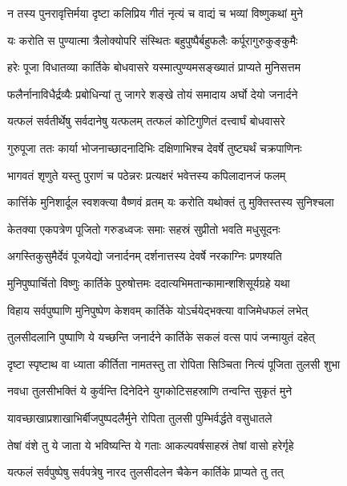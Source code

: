 \twolineshloka
{न तस्य पुनरावृत्तिर्मया दृष्टा कलिप्रिय}
{गीतं नृत्यं च वाद्यं च भव्यां विष्णुकथां मुने}%

\twolineshloka
{यः करोति स पुण्यात्मा त्रैलोक्योपरि संस्थितः}
{बहुपुष्पैर्बहुफलैः कर्पूरागुरुकुङ्कुमैः}%

\twolineshloka
{हरेः पूजा विधातव्या कार्तिके बोधवासरे}
{यस्मात्पुण्यमसङ्ख्यातं प्राप्यते मुनिसत्तम}%

\twolineshloka
{फलैर्नानाविधैर्द्रव्यैः प्रबोधिन्यां तु जागरे}
{शङ्खे तोयं समादाय अर्घो देयो जनार्दने}%

\twolineshloka
{यत्फलं सर्वतीर्थेषु सर्वदानेषु यत्फलम्}
{तत्फलं कोटिगुणितं दत्त्वार्घं बोधवासरे}%

\twolineshloka
{गुरुपूजा ततः कार्या भोजनाच्छादनादिभिः}
{दक्षिणाभिश्च देवर्षे तुष्ट्यर्थं चक्रपाणिनः}%

\twolineshloka
{भागवतं शृणुते यस्तु पुराणं च पठेन्नरः}
{प्रत्यक्षरं भवेत्तस्य कपिलादानजं फलम्}%

\twolineshloka
{कार्त्तिके मुनिशार्दूल स्वशक्त्या वैष्णवं व्रतम्}
{यः करोति यथोक्तं तु मुक्तिस्तस्य सुनिश्चला}%

\twolineshloka
{केतक्या एकपत्रेण पूजितो गरुडध्वजः}
{समाः सहस्रं सुप्रीतो भवति मधुसूदनः}%

\twolineshloka
{अगस्तिकुसुमैर्देवं पूजयेद्यो जनार्दनम्}
{दर्शनात्तस्य देवर्षे नरकाग्निः प्रणश्यति}%

\twolineshloka
{मुनिपुष्पार्चितो विष्णुः कार्तिके पुरुषोत्तमः}
{ददात्यभिमतान्कामान्शशिसूर्यग्रहे यथा}%

\twolineshloka
{विहाय सर्वपुष्पाणि मुनिपुष्पेण केशवम्}
{कार्तिके योऽर्चयेद्भक्त्या वाजिमेधफलं लभेत्}%

\twolineshloka
{तुलसीदलानि पुष्पाणि ये यच्छन्ति जनार्दने}
{कार्तिके सकलं वत्स पापं जन्मायुतं दहेत्}%

\twolineshloka
{दृष्टा स्पृष्टाथ वा ध्याता कीर्तिता नामतस्तु ता}
{रोपिता सिञ्चिता नित्यं पूजिता तुलसी शुभा}%

\twolineshloka
{नवधा तुलसीभक्तिं ये कुर्वन्ति दिनेदिने}
{युगकोटिसहस्राणि तन्वन्ति सुकृतं मुने}%

\twolineshloka
{यावच्छाखाप्रशाखाभिर्बीजपुष्पदलैर्मुने}
{रोपिता तुलसी पुम्भिर्वर्द्धते वसुधातले}%

\twolineshloka
{तेषां वंशे तु ये जाता ये भविष्यन्ति ये गताः}
{आकल्पवर्षसाहस्रं तेषां वासो हरेर्गृहे}%

\twolineshloka
{यत्फलं सर्वपुष्पेषु सर्वपत्रेषु नारद}
{तुलसीदलेन चैकेन कार्तिके प्राप्यते तु तत्}%

